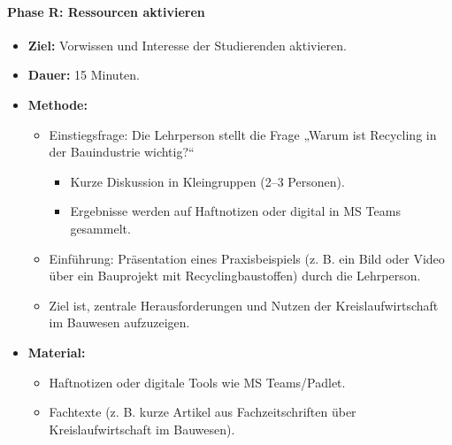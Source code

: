 \documentclass[
11pt,
captions=tableheading,
smallheadings,
headsepline,
footsepline, 
captions=tableheading,
parskip=half-,
]{scrartcl}
\begin{document}
\paragraph{Phase R: Ressourcen aktivieren}
\begin{itemize}
    \item \textbf{Ziel:} Vorwissen und Interesse der Studierenden aktivieren.
    \item \textbf{Dauer:} 15 Minuten.
    \item \textbf{Methode:}
    \begin{itemize}
        \item Einstiegsfrage: Die Lehrperson stellt die Frage „Warum ist Recycling in der Bauindustrie wichtig?“
        \begin{itemize}
            \item Kurze Diskussion in Kleingruppen (2–3 Personen).
            \item Ergebnisse werden auf Haftnotizen oder digital in MS Teams gesammelt.
        \end{itemize}
        \item Einführung: Präsentation eines Praxisbeispiels (z. B. ein Bild oder Video über ein Bauprojekt mit Recyclingbaustoffen) durch die Lehrperson.
        \item Ziel ist, zentrale Herausforderungen und Nutzen der Kreislaufwirtschaft im Bauwesen aufzuzeigen.
    \end{itemize}
    \item \textbf{Material:}
    \begin{itemize}
        \item Haftnotizen oder digitale Tools wie MS Teams/Padlet.
        \item Fachtexte (z. B. kurze Artikel aus Fachzeitschriften über Kreislaufwirtschaft im Bauwesen).
    \end{itemize}
\end{itemize}
\end{document}
